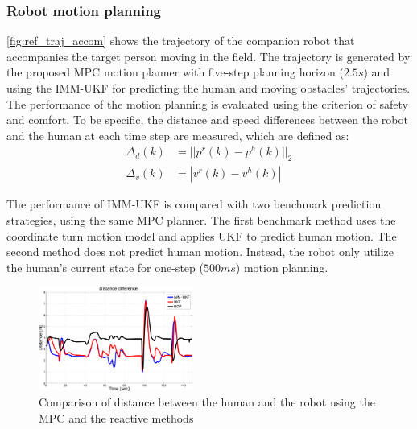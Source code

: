 \documentclass[letterpaper, 10 pt, conference]{ieeeconf}
\begin{document}
	\subsubsection{Robot motion planning}\label{subsubsec:motion_plan}
	\cref{fig:ref_traj_accom} shows the trajectory of the companion robot that accompanies the target person moving in the field. The trajectory is generated by the proposed MPC motion planner with five-step planning horizon ($2.5s$) and using the IMM-UKF for predicting the human and moving obstacles' trajectories.
	The performance of the motion planning is evaluated using the criterion of safety and comfort.
	To be specific, the distance and speed differences between the robot and the human at each time step are measured, which are defined as:
	\begin{subequations}
		\begin{align}
		\Delta_d(k)&=||p^r(k)-p^h(k)||_2\label{eqn:err_d}\\
		\Delta_v(k)&=|v^r(k)-v^h(k)|\label{eqn:err_v}
		\end{align}
	\end{subequations}
	
	The performance of IMM-UKF is compared with two benchmark prediction strategies, using the same MPC planner.
	The first benchmark method uses the coordinate turn motion model and applies UKF to predict human motion.
	The second method does not predict human motion.
	Instead, the robot only utilize the human's current state for one-step ($500ms$) motion planning.
	
	\begin{figure}
		\centering
		\includegraphics[width=0.45\textwidth]{figures/dis_diff2.pdf}
		\caption{Comparison of distance between the human and the robot using the MPC and the reactive methods}
		\label{fig:err_d}
	\end{figure}
	
\end{document}
